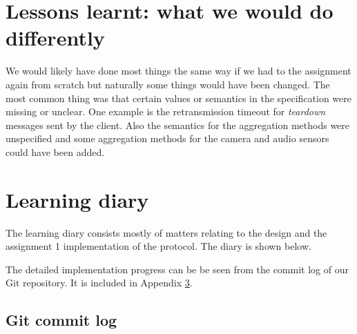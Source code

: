 \documentclass[a4paper]{article}
\begin{document}
\section{Lessons learnt: what we would do differently}
We would likely have done most things the same way if we had to the assignment
again from scratch but naturally some things would have been changed. The most
common thing was that certain values or semantics in the specification were
missing or unclear. One example is the retransmission timeout for \emph{teardown}
messages sent by the client. Also the semantics for the aggregation methods
were unspecified and some aggregation methods for the camera and audio sensors
could have been added. 


\section{Learning diary}
The learning diary consists mostly of matters relating to the design and the
assignment 1 implementation of the protocol. The diary is shown below.

The detailed implementation progress can be be seen from the commit log of our
Git repository. It is included in Appendix \ref{lst:commit_log}.



\clearpage
\begin{appendices}
  \section{Git commit log}\label{lst:commit_log}
  
\end{appendices}
\end{document}
